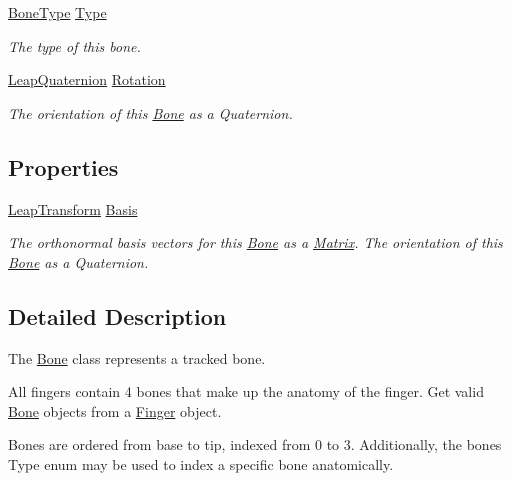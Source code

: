 \begin{DoxyCompactItemize}
\mbox{\hyperlink{class_leap_1_1_bone_a21054e31cefa7b75f25a026006fdbb1b}{Bone\+Type}} \mbox{\hyperlink{class_leap_1_1_bone_a45b59267b7a357e45ccf28a8c2daf0a6}{Type}}
\begin{DoxyCompactList}\small\item\em The type of this bone. \end{DoxyCompactList}\item 
\mbox{\hyperlink{struct_leap_1_1_leap_quaternion}{Leap\+Quaternion}} \mbox{\hyperlink{class_leap_1_1_bone_a1531c2eecaace7d4532e78f903f3b59a}{Rotation}}
\begin{DoxyCompactList}\small\item\em The orientation of this \mbox{\hyperlink{class_leap_1_1_bone}{Bone}} as a Quaternion. \end{DoxyCompactList}\end{DoxyCompactItemize}
\subsection*{Properties}
\begin{DoxyCompactItemize}
\item 
\mbox{\hyperlink{struct_leap_1_1_leap_transform}{Leap\+Transform}} \mbox{\hyperlink{class_leap_1_1_bone_a3918f3a7fe8406e54c4715aed7504ab9}{Basis}}
\begin{DoxyCompactList}\small\item\em The orthonormal basis vectors for this \mbox{\hyperlink{class_leap_1_1_bone}{Bone}} as a \mbox{\hyperlink{struct_leap_1_1_matrix}{Matrix}}. The orientation of this \mbox{\hyperlink{class_leap_1_1_bone}{Bone}} as a Quaternion. \end{DoxyCompactList}\end{DoxyCompactItemize}


\subsection{Detailed Description}
The \mbox{\hyperlink{class_leap_1_1_bone}{Bone}} class represents a tracked bone. 

All fingers contain 4 bones that make up the anatomy of the finger. Get valid \mbox{\hyperlink{class_leap_1_1_bone}{Bone}} objects from a \mbox{\hyperlink{class_leap_1_1_finger}{Finger}} object.

Bones are ordered from base to tip, indexed from 0 to 3. Additionally, the bone\textquotesingle{}s Type enum may be used to index a specific bone anatomically.

